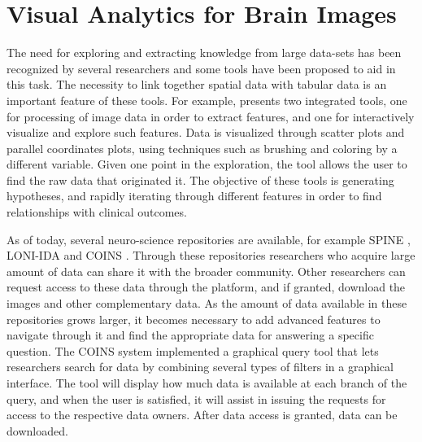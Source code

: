 

\section{Visual Analytics for Brain Images}


The need for exploring and extracting knowledge from large data-sets has been recognized by several researchers and some tools have been proposed to aid in this task. The necessity to link together spatial data with tabular data is an important feature of these tools. For example, \autocite{steenwijk_integrated_2010} presents two integrated tools, one for processing of image data in order to extract features, and one for interactively visualize and explore such features. Data is visualized through scatter plots and parallel coordinates plots, using techniques such as brushing and coloring by a different variable.  Given one point in the exploration, the tool allows the user to find the raw data that originated it. The objective of these tools is generating hypotheses, and rapidly iterating through different features in order to find relationships with clinical outcomes. 


As of today, several neuro-science repositories are available, for example SPINE \autocite{guttmann_spine_2012}, LONI-IDA \autocite{van_horn_is_2009} and COINS \autocite{wood_harnessing_2014}. Through these repositories researchers who acquire large amount of data can share it with the broader community. Other researchers can request access to these data through the platform, and if granted, download the images and other complementary data. As the amount of data available in these repositories grows larger, it becomes necessary to add advanced features to navigate through it and find the appropriate data for answering a specific question. The COINS system implemented a graphical query tool\autocite{wood_harnessing_2014} that lets researchers search for data by combining several types of filters in a graphical interface. The tool will display how much data is available at each branch of the query, and when the user is satisfied, it will assist in issuing the requests for access to the respective data owners.  After data access is granted, data can be downloaded.

